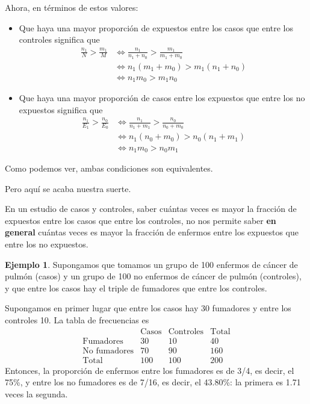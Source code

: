 \documentclass[
]{book}
\theoremstyle{definition}
\theoremstyle{definition}
\newtheorem{example}{Ejemplo}[chapter]
\theoremstyle{definition}
\theoremstyle{definition}
\theoremstyle{remark}
\begin{document}
Ahora, en términos de estos valores:

\begin{itemize}
\item
  Que haya una mayor proporción de expuestos entre los casos que entre los controles significa que
  \[
  \begin{array}{rl}
  \displaystyle \frac{n_1}{N}>\frac{m_1}{M} & \Longleftrightarrow \displaystyle
  \frac{n_1}{n_1+n_0}>\frac{m_1}{m_1+m_0}\\
  & \Longleftrightarrow n_1(m_1+m_0)>m_1(n_1+n_0)
  \\
  & \Longleftrightarrow n_1m_0>m_1n_0
  \end{array}
  \]
\item
  Que haya una mayor proporción de casos entre los expuestos que entre los no expuestos significa que
  \[
  \begin{array}{rl}
  \displaystyle \frac{n_1}{E_1}>\frac{n_0}{E_0} & \Longleftrightarrow \displaystyle
  \frac{n_1}{n_1+m_1}>\frac{n_0}{n_0+m_0}\\
  & \Longleftrightarrow n_1(n_0+m_0)>n_0(n_1+m_1)
  \\
  & \Longleftrightarrow n_1m_0>n_0m_1
  \end{array}
  \]
\end{itemize}

Como podemos ver, ambas condiciones son equivalentes.

Pero aquí se acaba nuestra suerte.

\begin{rmdcaution}
En un estudio de casos y controles, saber cuántas veces es mayor la fracción de expuestos entre los casos que entre los controles, no nos permite saber \textbf{en general} cuántas veces es mayor la fracción de enfermos entre los expuestos que entre los no expuestos.
\end{rmdcaution}

\begin{example}
\protect\hypertarget{exm:fumadorescancer1}{}\label{exm:fumadorescancer1}Supongamos que tomamos un grupo de 100 enfermos de cáncer de pulmón (casos) y un grupo de 100 no enfermos de cáncer de pulmón (controles), y que entre los casos hay el triple de fumadores que entre los controles.
\end{example}

Supongamos en primer lugar que entre los casos hay 30 fumadores y entre los controles 10. La tabla de frecuencias es
\[
\begin{array}{r|c|c|c}
& \text{Casos} & \text{Controles} & \text{Total} \\ \hline
\text{Fumadores} & 30 & 10 & 40\\ \hline
\text{No fumadores} & 70 & 90 & 160\\ \hline
\text{Total} & 100 & 100 & 200
\end{array}
\]
Entonces, la proporción de enfermos entre los fumadores es de 3/4, es decir, el 75\%, y entre los no fumadores es de 7/16, es decir, el 43.80\%: la primera es 1.71 veces la segunda.
\end{document}
